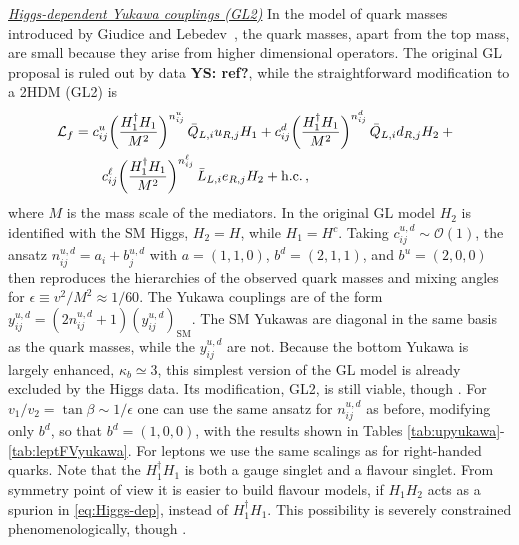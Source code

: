 \documentclass[../report.tex]{subfiles}
\begin{document}
\underline{\it Higgs-dependent Yukawa couplings (GL2)} In the model of
quark masses introduced by Giudice and Lebedev~\cite{Giudice:2008uua}, the quark masses, apart from the top
mass, are small because they arise from higher dimensional
operators. The original GL proposal is ruled out by data {\bf YS: ref?}, while the
straightforward modification to a 2HDM (GL2) is
\begin{equation}\label{eq:Higgs-dep}
\begin{split}
{\cal L}_{f}&=c_{ij}^{u} \bigg( \frac{H_1^\dagger H_1}{M^2}
  \bigg)^{n_{ij}^{u}} \, \bar Q_{L,i} u_{R,j} H_1 + c_{ij}^{d} \bigg( \frac{H_1^\dagger H_1}{M^2}
  \bigg)^{n_{ij}^{d}} \, \bar Q_{L,i} d_{R,j} H_2 + \phantom{c}\\
  &\qquad c_{ij}^\ell \bigg( \frac{H_1^\dagger H_1}{M^2}
  \bigg)^{n_{ij}^{\ell}} \, \bar L_{L,i} e_{R,j} H_2 +\text{h.c.}\,,
\end{split}
\end{equation}
where $M$ is the mass scale of the mediators.  In the original GL
model $H_2$ is identified with the SM Higgs, $H_2=H$, while
$H_1=H^c$. Taking $c_{ij}^{u,d}\sim {\mathcal
  O}(1)$, the ansatz $n_{ij}^{u,d}=a_i +b_j^{u,d}$ with $a=(1,1,0)$,
$b^d=(2,1,1)$, and $b^u=(2,0,0)$ then reproduces the hierarchies of
the observed quark masses and mixing angles for $\epsilon \equiv
v^2/M^2 \approx 1/60$. The Yukawa couplings are of the form $
y_{ij}^{u,d} = (2n_{ij}^{u,d} + 1) (y_{ij}^{u,d})_\text{SM}$. The SM
Yukawas are diagonal in the same basis as the quark masses,
while the $y_{ij}^{u,d}$ are not.  Because the bottom Yukawa is
largely enhanced, $\kappa_b \simeq 3$, this simplest version of the GL
model is already excluded by the Higgs data. Its modification, GL2, is
still viable, though \cite{Bishara:2015cha}. For
$v_1/v_2=\tan\beta\sim 1/\epsilon$ one can use the same ansatz for
$n_{ij}^{u,d}$ as before, modifying only $b^d$, so that $b^d=(1,0,0)$,
with the results shown in Tables
\ref{tab:upyukawa}-\ref{tab:leptFVyukawa}. For leptons we use the same
scalings as for right-handed quarks. Note that the $H_1^\dagger H_1$
is both a gauge singlet and a flavour singlet. From symmetry point of
view it is easier to build flavour models, if $H_1 H_2$ acts as a
spurion in \eqref{eq:Higgs-dep}, instead of $H_1^\dagger H_1$. This
possibility is severely constrained phenomenologically, though
\cite{Bauer:2015fxa,Bauer:2015kzy}.
\end{document}
